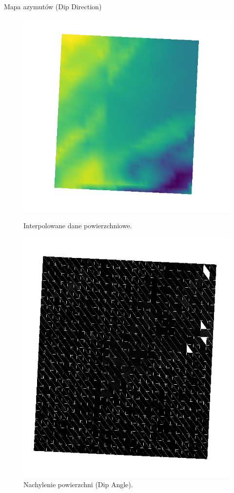 \documentclass{beamer}
\begin{document}
\begin{frame}{Mapa azymutów (Dip Direction)}
\begin{figure}
\begin{minipage}{0.3\textwidth}
            \includegraphics[width=\textwidth]{Inter.png}
            \caption{Interpolowane dane powierzchniowe.}
        \end{minipage}
        \hspace{0.2cm} %
        \begin{minipage}{0.3\textwidth}
            \centering
            \includegraphics[width=\textwidth]{nach.png}
            \caption{Nachylenie powierzchni (Dip Angle).}
        \end{minipage}
    \end{figure}
\end{frame}
\end{document}
